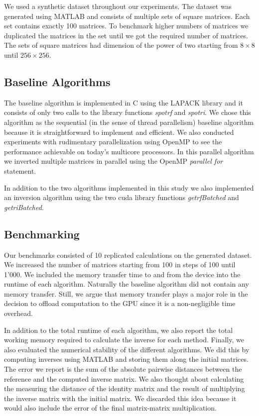 \documentclass[11pt]{article}
\begin{document}
We used a synthetic dataset throughout our experiments. The dataset was generated using MATLAB and consists of multiple sets of square matrices. Each set contains exactly 100 matrices. To benchmark higher numbers of matrices we duplicated the matrices in the set until we got the required number of matrices. The sets of square matrices had dimension of the power of two starting from $8 \times 8$ until $256 \times 256$.

\subsection{Baseline Algorithms}

The baseline algorithm is implemented in C using the LAPACK library and it consists of only two calls to the library functions {\it spotrf} and {\it spotri}. We chose this algorithm as the sequential (in the sense of thread parallelism) baseline algorithm because it is straightforward to implement and efficient. We also conducted experiments with rudimentary parallelization using OpenMP to see the performance achievable on today's multicore processors. In this parallel algorithm we inverted multiple matrices in parallel using the OpenMP \textit{parallel for} statement.

In addition to the two algorithms implemented in this study we also implemented an inversion algorithm using the two cuda library functions {\it getrfBatched} and {\it getriBatched}.

\subsection{Benchmarking}

Our benchmarks consisted of 10 replicated calculations on the generated dataset. We increased the number of matrices starting from 100 in steps of 100 until 1’000. We included the memory transfer time to and from the device into the runtime of each algorithm. Naturally the baseline algorithm did not contain any memory transfer. Still, we argue that memory transfer plays a major role in the decision to offload computation to the GPU since it is a non-negligible time overhead.

In addition to the total runtime of each algorithm, we also report the total working memory required to calculate the inverse for each method. Finally, we also evaluated the numerical stability of the different algorithms. We did this by computing inverses using MATLAB and storing them along the initial matrices. The error we report is the sum of the absolute pairwise distances between the reference and the computed inverse matrix. We also thought about calculating the measuring the distance of the identity matrix and the result of multiplying the inverse matrix with the initial matrix. We discarded this idea because it would also include the error of the final matrix-matrix multiplication.
\end{document}
